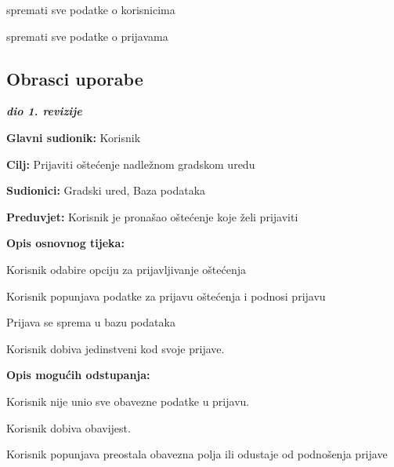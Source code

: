 \begin{packed_enum}
				\item  {}
				\begin{packed_enum}
					\item spremati sve podatke o korisnicima
					\item spremati sve podatke o prijavama
				\end{packed_enum}
				
			\end{packed_enum}
						
			\eject 
			
				
						
			\subsection{Obrasci uporabe}
				
				\textbf{\textit{dio 1. revizije}}

					\noindent {}
					\begin{packed_item}
	
						\item \textbf{Glavni sudionik:} Korisnik
						\item  \textbf{Cilj:} Prijaviti oštećenje nadležnom gradskom uredu
						\item  \textbf{Sudionici:} Gradski ured, Baza podataka
						\item  \textbf{Preduvjet:} Korisnik je pronašao oštećenje koje želi prijaviti
						
						\item  \textbf{Opis osnovnog tijeka:}
						\item[] \begin{packed_enum}
							\item Korisnik odabire opciju za prijavljivanje oštećenja
							\item Korisnik popunjava podatke za prijavu oštećenja i podnosi prijavu
							\item Prijava se sprema u bazu podataka
							\item Korisnik dobiva jedinstveni kod svoje prijave.
						\end{packed_enum}
						
						\item  \textbf{Opis mogućih odstupanja:}
						\item[] \begin{packed_item}
							\item[2.a] Korisnik nije unio sve obavezne podatke u prijavu.
							\item[] \begin{packed_enum}
								\item Korisnik dobiva obavijest.
								\item Korisnik popunjava preostala obavezna polja ili odustaje od podnošenja prijave
							\end{packed_enum}
							
						\end{packed_item}
					\end{packed_item}
					
